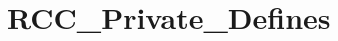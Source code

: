 \hypertarget{group___r_c_c___private___defines}{\section{R\-C\-C\-\_\-\-Private\-\_\-\-Defines}
\label{group___r_c_c___private___defines}
}
